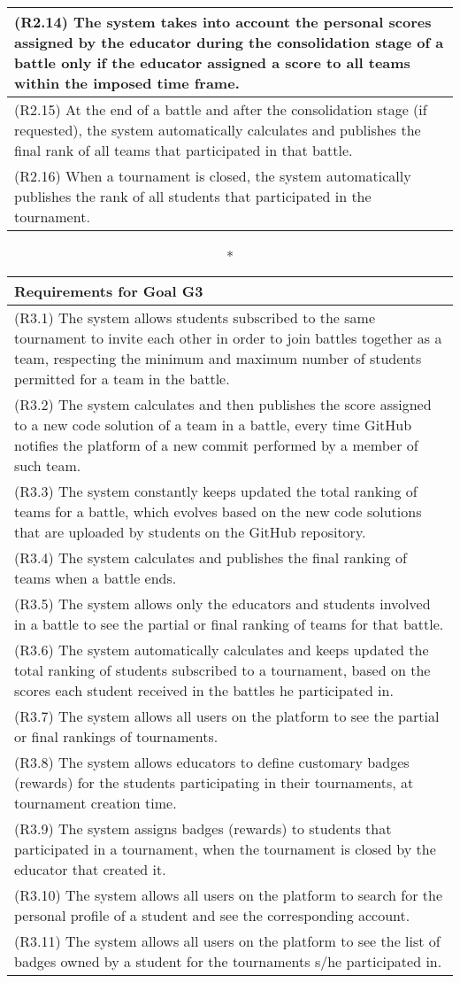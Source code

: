 \begin{longtable}{|p{16.5cm}|}
\hline
(R2.14) The system takes into account the personal scores assigned by the educator during the consolidation stage of a battle only if the educator assigned a score to all teams within the imposed time frame. \\
\hline
(R2.15) At the end of a battle and after the consolidation stage (if requested), the system automatically calculates and publishes the final rank of all teams that participated in that battle.  \\
\hline
(R2.16) When a tournament is closed, the system automatically publishes the rank of all students that participated in the tournament. \\
\hline

\end{longtable}

\begin{longtable}{|p{16.5cm}|}
	\caption*{Requirements for Goal G3}\\
	\hline
	

(R3.1) The system allows students subscribed to the same tournament to invite each other in order to join battles together as a team, respecting the minimum and maximum number of students permitted for a team in the battle. \\
\hline
(R3.2) The system calculates and then publishes the score assigned to a new code solution of a team in a battle, every time GitHub notifies the platform of a new commit performed by a member of such team. \\
\hline
(R3.3) The system constantly keeps updated the total ranking of teams for a battle, which evolves based on the new code solutions that are uploaded by students on the GitHub repository. \\
\hline
(R3.4) The system calculates and publishes the final ranking of teams when a battle ends. \\
\hline
(R3.5) The system allows only the educators and students involved in a battle to see the partial or final ranking of teams for that battle. \\
\hline
(R3.6) The system automatically calculates and keeps updated the total ranking of students subscribed to a tournament, based on the scores each student received in the battles he participated in. \\
\hline
(R3.7) The system allows all users on the platform to see the partial or final rankings of tournaments. \\
\hline
(R3.8)  The system allows educators to define customary badges (rewards) for the students participating in their tournaments, at tournament creation time. \\
\hline
(R3.9) The system assigns badges (rewards) to students that participated in a tournament, when the tournament is closed by the educator that created it. \\
\hline
(R3.10) The system allows all users on the platform to search for the personal profile of a student and see the corresponding account. \\
\hline
(R3.11) The system allows all users on the platform to see the list of badges owned by a student for the tournaments s/he participated in. \\
\hline

\end{longtable}
